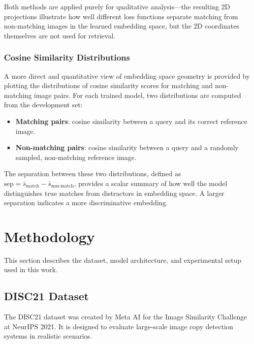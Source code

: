 \documentclass[
    english,
]{VUMIFPSbakalaurinis}
\begin{document}
Both methods are applied purely for qualitative analysis---the resulting 2D projections illustrate how well different loss functions separate matching from non-matching images in the learned embedding space, but the 2D coordinates themselves are not used for retrieval.

\subsubsection{Cosine Similarity Distributions}

A more direct and quantitative view of embedding space geometry is provided by plotting the distributions of cosine similarity scores for matching and non-matching image pairs. For each trained model, two distributions are computed from the development set:
\begin{itemize}
    \item \textbf{Matching pairs}: cosine similarity between a query and its correct reference image.
    \item \textbf{Non-matching pairs}: cosine similarity between a query and a randomly sampled, non-matching reference image.
\end{itemize}

The separation between these two distributions, defined as $\text{sep} = \bar{s}_{\text{match}} - \bar{s}_{\text{non-match}}$, provides a scalar summary of how well the model distinguishes true matches from distractors in embedding space. A larger separation indicates a more discriminative embedding.

\section{Methodology}

This section describes the dataset, model architecture, and experimental setup used in this work.

\subsection{DISC21 Dataset}

The DISC21 dataset \cite{Dou21} was created by Meta AI for the Image Similarity Challenge at NeurIPS 2021. It is designed to evaluate large-scale image copy detection systems in realistic scenarios.
\end{document}
